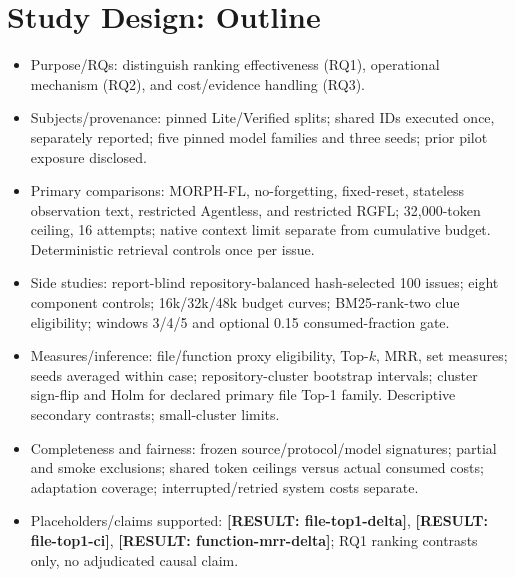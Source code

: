 \documentclass[letterpaper,journal]{IEEEtran}
\makeatletter
\newcommand{\resultslot}[1]{\textcolor{blue!65!black}{\textbf{[RESULT: #1]}}}
\newcommand{\res}[1]{\resultslot{#1}}
\newcommand{\resrange}[1]{\resultslot{#1}}
\newcommand{\boundresult}[1]{\ifcsname result@#1\endcsname\csname result@#1\endcsname\else\PackageError{morph-results}{Missing result key #1}{Supply audited binding}\fi}
\newcommand{\res}[1]{\boundresult{#1}}
\newcommand{\resrange}[1]{\boundresult{#1}}
\makeatother
\begin{document}
\section{Study Design: Outline}\label{sec:study}
\begin{itemize}
\item Purpose/RQs: distinguish ranking effectiveness (RQ1), operational mechanism (RQ2), and cost/evidence handling (RQ3).
\item Subjects/provenance: pinned Lite/Verified splits; shared IDs executed once, separately reported; five pinned model families and three seeds; prior pilot exposure disclosed.
\item Primary comparisons: MORPH-FL, no-forgetting, fixed-reset, stateless observation text, restricted Agentless, and restricted RGFL; 32,000-token ceiling, 16 attempts; native context limit separate from cumulative budget. Deterministic retrieval controls once per issue.
\item Side studies: report-blind repository-balanced hash-selected 100 issues; eight component controls; 16k/32k/48k budget curves; BM25-rank-two clue eligibility; windows 3/4/5 and optional 0.15 consumed-fraction gate.
\item Measures/inference: file/function proxy eligibility, Top-$k$, MRR, set measures; seeds averaged within case; repository-cluster bootstrap intervals; cluster sign-flip and Holm for declared primary file Top-1 family. Descriptive secondary contrasts; small-cluster limits.
\item Completeness and fairness: frozen source/protocol/model signatures; partial and smoke exclusions; shared token ceilings versus actual consumed costs; adaptation coverage; interrupted/retried system costs separate.
\item Placeholders/claims supported: \res{file-top1-delta}, \resrange{file-top1-ci}, \res{function-mrr-delta}; RQ1 ranking contrasts only, no adjudicated causal claim.
\end{itemize}
\end{document}
